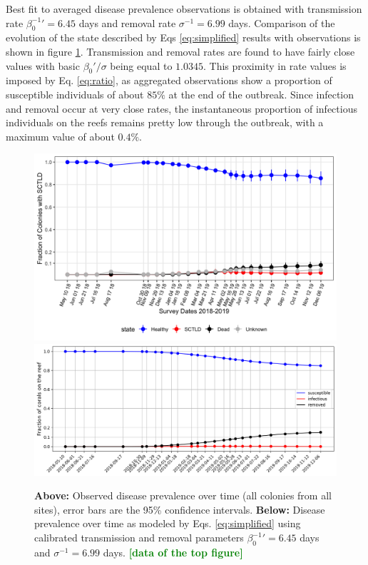 \documentclass[utf8]{frontiersSCNS}
\newcommand{\erinn}[1]{\textbf{\textcolor{green}{#1}}}
\newcommand{\dobby}[1]{\textbf{\color{violet}{#1}}}
\begin{document}
Best fit to averaged disease prevalence observations is obtained with transmission rate $\beta_0^{-1}'=6.45$ days and removal rate $\sigma^{-1}=6.99$ days. Comparison of the evolution of the state described by Eqs \ref{eq:simplified} results with observations is shown in figure \ref{fig:calibration}. Transmission and removal rates are found to have fairly close values with basic  $\beta_0'/\sigma$ being equal to $1.0345$. This proximity in rate values is imposed by Eq. \ref{eq:ratio}, as aggregated observations show a proportion of susceptible individuals of about $85\%$ at the end of the outbreak. Since infection and removal occur at very close rates, the instantaneous proportion of infectious individuals on the reefs remains pretty low through the outbreak, with a maximum value of about $0.4\%$.
\dobby{[I might come up with some more ideas when figures merged, as it will ease comparisons]}

\begin{figure}
    \centering
    \includegraphics[width=.7\textwidth]{figures/image2.png}
    \includegraphics[width=.69\textwidth]{figures/sir_obs.png}
    \caption{\textbf{Above:} Observed disease prevalence over time (all colonies from all sites), error bars are the 95\% confidence intervals. \textbf{Below:} Disease prevalence over time as modeled by Eqs. \ref{eq:simplified} using calibrated transmission and removal parameters  $\beta_0^{-1}'=6.45$ days and $\sigma^{-1}=6.99$ days. \erinn{[data of the top figure]}}
    \label{fig:calibration}
\end{figure}
\end{document}
